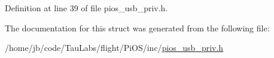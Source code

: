 \-Definition at line 39 of file pios\-\_\-usb\-\_\-priv.\-h.



\-The documentation for this struct was generated from the following file\-:\begin{DoxyCompactItemize}
\item 
/home/jb/code/\-Tau\-Labs/flight/\-Pi\-O\-S/inc/\hyperlink{pios__usb__priv_8h}{pios\-\_\-usb\-\_\-priv.\-h}\end{DoxyCompactItemize}

